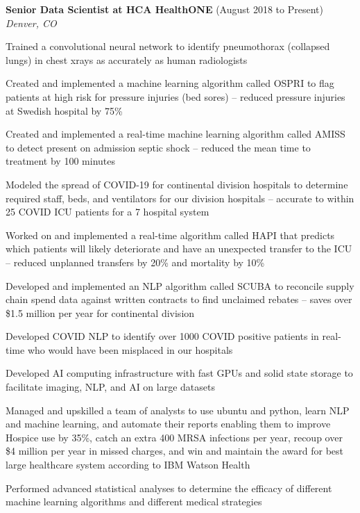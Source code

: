\begin{resume}
    {\bf Senior Data Scientist at HCA HealthONE} (August 2018 to Present)\\\vspace{2mm}%
    \textit{Denver, CO}
    \begin{stuff}
        \vspace*{1mm}
            \item Trained a convolutional neural network to identify pneumothorax (collapsed lungs) in chest xrays as accurately as human radiologists
            \item Created and implemented a machine learning algorithm called OSPRI to flag patients at high risk for pressure injuries (bed sores) -- reduced pressure injuries at Swedish hospital by 75\%
            \item Created and implemented a real-time machine learning algorithm called AMISS to detect present on admission septic shock -- reduced the mean time to treatment by 100 minutes
   \        \item Modeled the spread of COVID-19 for continental division hospitals to determine required staff, beds, and ventilators for our division hospitals -- accurate to within 25 COVID ICU patients for a 7 hospital system
            \item Worked on and implemented a real-time algorithm called HAPI that predicts which patients will likely deteriorate and have an unexpected transfer to the ICU -- reduced unplanned transfers by 20\% and mortality by 10\%
            \item Developed and implemented an NLP algorithm called SCUBA to reconcile supply chain spend data against written contracts to find unclaimed rebates -- saves over \$1.5 million per year for continental division
            \item Developed COVID NLP to identify over 1000 COVID positive patients in real-time who would have been misplaced in our hospitals
            \item Developed AI computing infrastructure with fast GPUs and solid state storage to facilitate imaging, NLP, and AI on large datasets
            \item Managed and upskilled a team of analysts to use ubuntu and python, learn NLP and machine learning, and automate their reports enabling them to improve Hospice use by 35\%, catch an extra 400 MRSA infections per year, recoup over \$4 million per year in missed charges, and win and maintain the award for best large healthcare system according to IBM Watson Health
            \item Performed advanced statistical analyses to determine the efficacy of different machine learning algorithms and different medical strategies
    \end{stuff}


\end{resume}
